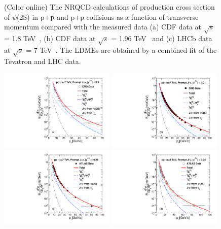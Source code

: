 \documentclass[12pt,a4paper,final]{iopart}
\begin{document}
\begin{figure}
\begin{minipage}{0.5\linewidth}
\end{minipage}%
\caption{(Color online) The NRQCD calculations of production cross section 
of $\psi$(2S) in p+${\bar {\rm p}}$ and p+p collisions as a function of transverse 
momentum compared with the measured  data 
(a) CDF data at $\sqrt{s}$ = 1.8 TeV~\cite{Abe:1997jz}, 
(b) CDF data at $\sqrt{s}$ = 1.96 TeV~\cite{Acosta:2004yw} and 
(c) LHCb data at $\sqrt{s}$ = 7 TeV~\cite{Aaij:2012ag}.
 The LDMEs are obtained by a combined fit of the Tevatron and
LHC data.}
\label{Fig:LDMEPsi2SCDF}
\end{figure}







\begin{figure}
\includegraphics[width=0.49\textwidth]{Fig5a_CMS_New_D2NDPtDy_PromptJPsi_Y0009_Pt.pdf}
\includegraphics[width=0.49\textwidth]{Fig5b_CMS_Latest_D2NDPtDy_PromptJPsi_Y0012_Pt.pdf}
\includegraphics[width=0.49\textwidth]{Fig5c_ATLAS_7TeV_D2NDPtDy_PromptJPsi_Y0025_Pt.pdf}
\includegraphics[width=0.49\textwidth]{Fig5d_ATLAS_8TeV_D2NDPtDy_PromptJPsi_Y0025_Pt.pdf}

\end{figure}
\end{document}
